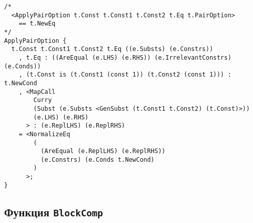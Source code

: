 \documentclass[12pt]{article}
\begin{document}
\begin{verbatim}
/*
  <ApplyPairOption t.Const t.Const1 t.Const2 t.Eq t.PairOption>
    == t.NewEq
*/
ApplyPairOption {
  t.Const t.Const1 t.Const2 t.Eq ((e.Substs) (e.Constrs))
    , t.Eq : ((AreEqual (e.LHS) (e.RHS)) (e.IrrelevantConstrs) (e.Conds))
    , (t.Const is (t.Const1 (const 1)) (t.Const2 (const 1))) : t.NewCond
    , <MapCall
        Curry
        (Subst (e.Substs <GenSubst (t.Const1 t.Const2) (t.Const)>))
        (e.LHS) (e.RHS)
      > : (e.ReplLHS) (e.ReplRHS)
    = <NormalizeEq
        (
          (AreEqual (e.ReplLHS) (e.ReplRHS))
          (e.Constrs) (e.Conds t.NewCond)
        )
      >;
}
\end{verbatim}


\subsection{Функция \texttt{BlockComp}}
\end{document}
